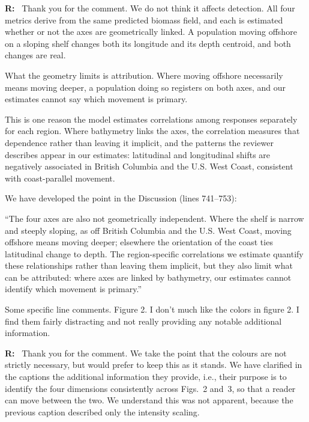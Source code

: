 \documentclass[11pt]{article}
\newcommand{\reviewer}[1]{\par\medskip\noindent\textcolor{revcolor}{#1}\par}
\newenvironment{reply}
{\par\smallskip\begingroup\color{replycolor}\noindent\textbf{R:}\ }
{\endgroup\par\medskip}
\begin{document}
\begin{reply}
Thank you for the comment. We do not think it affects detection. All four metrics derive from the same predicted biomass field, and each is estimated whether or not the axes are geometrically linked. A population moving offshore on a sloping shelf changes both its longitude and its depth centroid, and both changes are real.

What the geometry limits is attribution. Where moving offshore necessarily means moving deeper, a population doing so registers on both axes, and our estimates cannot say which movement is primary.

This is one reason the model estimates correlations among responses separately for each region. Where bathymetry links the axes, the correlation measures that dependence rather than leaving it implicit, and the patterns the reviewer describes appear in our estimates: latitudinal and longitudinal shifts are negatively associated in British Columbia and the U.S. West Coast, consistent with coast-parallel movement.

We have developed the point in the Discussion (lines 741--753):

\medskip

``The four axes are also not geometrically independent. Where the shelf is narrow and steeply sloping, as off British Columbia and the U.S. West Coast, moving offshore means moving deeper; elsewhere the orientation of the coast ties latitudinal change to depth. The region-specific correlations we estimate quantify these relationships rather than leaving them implicit, but they also limit what can be attributed: where axes are linked by bathymetry, our estimates cannot identify which movement is primary.''
\end{reply}



\reviewer{Some specific line comments.
Figure 2. I don't much like the colors in figure 2. I find them fairly distracting and not really providing any notable additional information.}

\begin{reply}
Thank you for the comment. We take the point that the colours are not strictly necessary, but would prefer to keep this as it stands. We have clarified in the captions the additional information they provide, i.e., their purpose is to identify the four dimensions consistently across Figs.~2 and~3, so that a reader can move between the two. We understand this was not apparent, because the previous caption described only the intensity scaling.
\end{reply}
\end{document}
